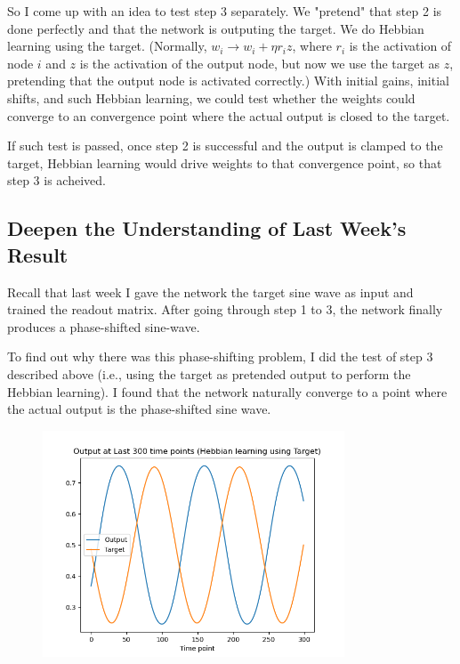 \documentclass[12pt, a4paper]{article}
\begin{document}
So I come up with an idea to test step 3 separately. We "pretend" that step 2 is done perfectly and that the network is outputing the target. We do Hebbian learning using the target. (Normally, $w_{i} \rightarrow w_{i} + \eta r_i z$, where $r_i$ is the activation of node $i$ and $z$ is the activation of the output node, but now we use the target as $z$, pretending that the output node is activated correctly.) With initial gains, initial shifts, and such Hebbian learning, we could test whether the weights could converge to an convergence point where the actual output is closed to the target.

If such test is passed, once step 2 is successful and the output is clamped to the target, Hebbian learning would drive weights to that convergence point, so that step 3 is acheived.

\newpage

\subsection*{Deepen the Understanding of Last Week's Result}

Recall that last week I gave the network the target sine wave as input and trained the readout matrix. After going through step 1 to 3, the network finally produces a phase-shifted sine-wave. 

To find out why there was this phase-shifting problem, I did the test of step 3 described above (i.e., using the target as pretended output to perform the Hebbian learning). I found that the network naturally converge to a point where the actual output is the phase-shifted sine wave.

\begin{figure}[H]
    \centering
    \includegraphics[width=0.8\textwidth]{RNN/FORCE/fig/FORCE_targethebb_lastoutput.png} \\
\end{figure}
\end{document}
